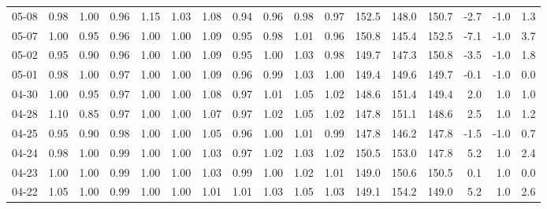 \begin{threeparttable}
{\begin{tabular}{lrrrrrrrrrrrrrrrr}
  05-08 &   0.98 &   1.00 &         0.96 &     1.15 &           1.03 &        1.08 &        0.94 &        0.96 &          0.98 &          0.97 & 152.5 & 148.0 & 150.7 &       -2.7 &                     -1.0 &                 1.3 \\
  05-07 &   1.00 &   0.95 &         0.96 &     1.00 &           1.00 &        1.09 &        0.95 &        0.98 &          1.01 &          0.96 & 150.8 & 145.4 & 152.5 &       -7.1 &                     -1.0 &                 3.7 \\
  05-02 &   0.95 &   0.90 &         0.96 &     1.00 &           1.00 &        1.09 &        0.95 &        1.00 &          1.03 &          0.98 & 149.7 & 147.3 & 150.8 &       -3.5 &                     -1.0 &                 1.8 \\
  05-01 &   0.98 &   1.00 &         0.97 &     1.00 &           1.00 &        1.09 &        0.96 &        0.99 &          1.03 &          1.00 & 149.4 & 149.6 & 149.7 &       -0.1 &                     -1.0 &                 0.0 \\
  04-30 &   1.00 &   0.95 &         0.97 &     1.00 &           1.00 &        1.08 &        0.97 &        1.01 &          1.05 &          1.02 & 148.6 & 151.4 & 149.4 &        2.0 &                      1.0 &                 1.0 \\
  04-28 &   1.10 &   0.85 &         0.97 &     1.00 &           1.00 &        1.07 &        0.97 &        1.02 &          1.05 &          1.02 & 147.8 & 151.1 & 148.6 &        2.5 &                      1.0 &                 1.2 \\
  04-25 &   0.95 &   0.90 &         0.98 &     1.00 &           1.00 &        1.05 &        0.96 &        1.00 &          1.01 &          0.99 & 147.8 & 146.2 & 147.8 &       -1.5 &                     -1.0 &                 0.7 \\
  04-24 &   0.98 &   1.00 &         0.99 &     1.00 &           1.00 &        1.03 &        0.97 &        1.02 &          1.03 &          1.02 & 150.5 & 153.0 & 147.8 &        5.2 &                      1.0 &                 2.4 \\
  04-23 &   1.00 &   1.00 &         0.99 &     1.00 &           1.00 &        1.03 &        0.99 &        1.00 &          1.02 &          1.01 & 149.0 & 150.6 & 150.5 &        0.1 &                      1.0 &                 0.0 \\
  04-22 &   1.05 &   1.00 &         0.99 &     1.00 &           1.00 &        1.01 &        1.01 &        1.03 &          1.05 &          1.03 & 149.1 & 154.2 & 149.0 &        5.2 &                      1.0 &                 2.6 \\

\end{tabular}}
\end{threeparttable}
